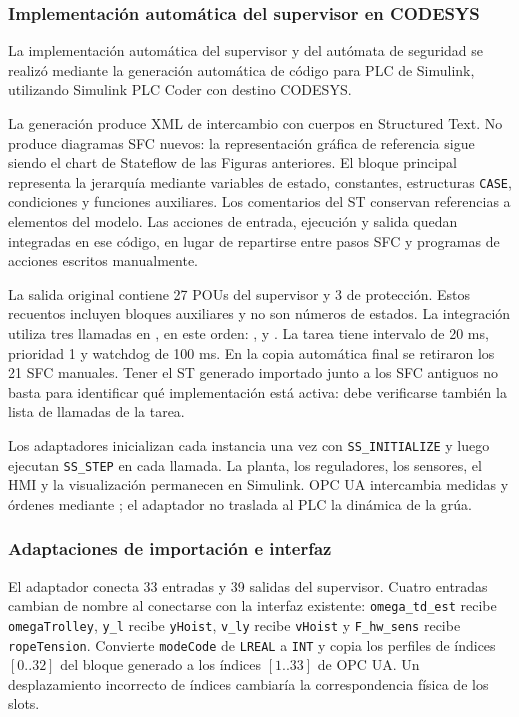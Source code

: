 \documentclass[a4paper,10pt,onecolumn,journal]{ieeeconf}
\numberwithin{equation}{section}
\begin{document}
\subsubsection{Implementación automática del supervisor en CODESYS}
La implementación automática del supervisor y del autómata de seguridad se realizó mediante la generación automática de código para PLC de Simulink, utilizando Simulink PLC Coder con destino CODESYS.

La generación produce XML de intercambio con cuerpos en Structured Text. No produce diagramas SFC nuevos: la representación gráfica de referencia sigue siendo el chart de Stateflow de las Figuras anteriores. El bloque principal  representa la jerarquía mediante variables de estado, constantes, estructuras \texttt{CASE}, condiciones y funciones auxiliares. Los comentarios del ST conservan referencias a elementos del modelo. Las acciones de entrada, ejecución y salida quedan integradas en ese código, en lugar de repartirse entre pasos SFC y programas de acciones escritos manualmente.

La salida original contiene 27 POUs del supervisor y 3 de protección. Estos recuentos incluyen bloques auxiliares y no son números de estados. La integración utiliza tres llamadas en , en este orden: ,  y . La tarea tiene intervalo de 20 ms, prioridad 1 y watchdog de 100 ms. En la copia automática final se retiraron los 21 SFC manuales. Tener el ST generado importado junto a los SFC antiguos no basta para identificar qué implementación está activa: debe verificarse también la lista de llamadas de la tarea.

Los adaptadores inicializan cada instancia una vez con \texttt{SS\_INITIALIZE} y luego ejecutan \texttt{SS\_STEP} en cada llamada. La planta, los reguladores, los sensores, el HMI y la visualización permanecen en Simulink. OPC UA intercambia medidas y órdenes mediante ; el adaptador no traslada al PLC la dinámica de la grúa.


\subsubsection{Adaptaciones de importación e interfaz}
El adaptador conecta 33 entradas y 39 salidas del supervisor. Cuatro entradas cambian de nombre al conectarse con la interfaz existente: \texttt{omega\_td\_est} recibe \texttt{omegaTrolley}, \texttt{y\_l} recibe \texttt{yHoist}, \texttt{v\_ly} recibe \texttt{vHoist} y \texttt{F\_hw\_sens} recibe \texttt{ropeTension}. Convierte \texttt{modeCode} de \texttt{LREAL} a \texttt{INT} y copia los perfiles de índices $[0..32]$ del bloque generado a los índices $[1..33]$ de OPC UA. Un desplazamiento incorrecto de índices cambiaría la correspondencia física de los slots.
\end{document}
